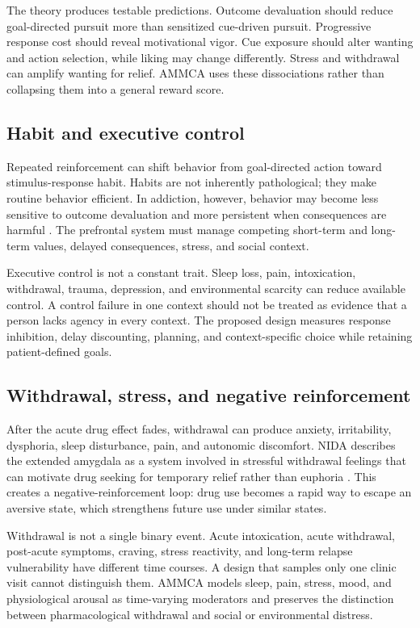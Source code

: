 \documentclass[conference]{IEEEtran}
\begin{document}
The theory produces testable predictions. Outcome devaluation should reduce goal-directed pursuit more than sensitized cue-driven pursuit. Progressive response cost should reveal motivational vigor. Cue exposure should alter wanting and action selection, while liking may change differently. Stress and withdrawal can amplify wanting for relief. AMMCA uses these dissociations rather than collapsing them into a general reward score.

\subsection{Habit and executive control}
Repeated reinforcement can shift behavior from goal-directed action toward stimulus-response habit. Habits are not inherently pathological; they make routine behavior efficient. In addiction, however, behavior may become less sensitive to outcome devaluation and more persistent when consequences are harmful \cite{EverittRobbins2005}. The prefrontal system must manage competing short-term and long-term values, delayed consequences, stress, and social context.

Executive control is not a constant trait. Sleep loss, pain, intoxication, withdrawal, trauma, depression, and environmental scarcity can reduce available control. A control failure in one context should not be treated as evidence that a person lacks agency in every context. The proposed design measures response inhibition, delay discounting, planning, and context-specific choice while retaining patient-defined goals.

\subsection{Withdrawal, stress, and negative reinforcement}
After the acute drug effect fades, withdrawal can produce anxiety, irritability, dysphoria, sleep disturbance, pain, and autonomic discomfort. NIDA describes the extended amygdala as a system involved in stressful withdrawal feelings that can motivate drug seeking for temporary relief rather than euphoria \cite{NIDABrain}. This creates a negative-reinforcement loop: drug use becomes a rapid way to escape an aversive state, which strengthens future use under similar states.

Withdrawal is not a single binary event. Acute intoxication, acute withdrawal, post-acute symptoms, craving, stress reactivity, and long-term relapse vulnerability have different time courses. A design that samples only one clinic visit cannot distinguish them. AMMCA models sleep, pain, stress, mood, and physiological arousal as time-varying moderators and preserves the distinction between pharmacological withdrawal and social or environmental distress.
\end{document}

